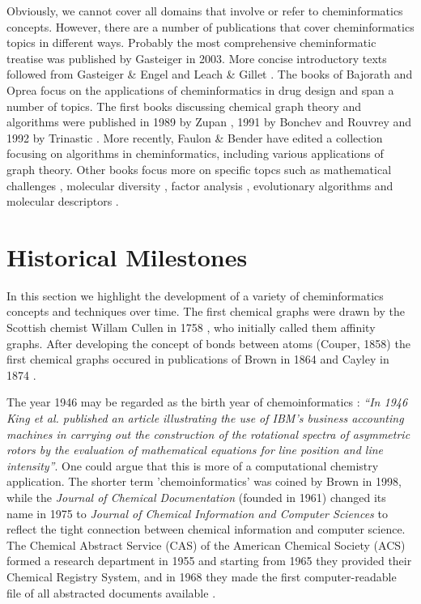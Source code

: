 \documentclass{sig-alternate}
\begin{document}
Obviously, we cannot cover all domains that involve or refer to
cheminformatics concepts. However, there are a number of publications
that cover cheminformatics topics in different ways.  Probably the
most comprehensive cheminformatic treatise was published by Gasteiger
\cite{Gasteiger2003} in 2003.  More concise introductory texts
followed from Gasteiger \& Engel \cite{gasteigerengel2003} and Leach
\& Gillet \cite{leachgillet2007}.  The books of Bajorath
\cite{Bajorath2004} and Oprea \cite{oprea2005} focus on the
applications of cheminformatics in drug design and span a number of
topics. The first books discussing chemical graph theory and
algorithms were published in 1989 by Zupan \cite{zupan1989}, 1991 by
Bonchev and Rouvrey \cite{bonchevrouvrey1991,bonchevrouvrey2003} and
1992 by Trinastic \cite{Trinajstic1992}.  More recently, Faulon \&
Bender \cite{faulon2010} have edited a collection focusing on
algorithms in cheminformatics, including various applications of graph
theory.  Other books focus more on specific topcs such as mathematical
challenges \cite{mathchallenges1995}, molecular diversity
\cite{moleculardiversity1999}, factor analysis \cite{Malinowski2002},
evolutionary algorithms \cite{clark2000} and molecular descriptors
\cite{todeschini2000}.

\section{Historical Milestones}
In this section we highlight the development of a variety of
cheminformatics concepts and techniques over time. The first chemical
graphs were drawn by the Scottish chemist Willam Cullen in 1758
\cite{bonchevrouvrey1991}, who initially called them affinity graphs.
After developing the concept of bonds between atoms (Couper, 1858) the
first chemical graphs occured in publications of Brown in 1864 and
Cayley in 1874 \cite{bonchevrouvrey1991,brown2009}.

The year 1946 may be regarded as the birth year of chemoinformatics
\cite{Chen2006}: \textit{``In 1946 King et al.\cite{kct1946} published
  an article illustrating the use of IBM's business accounting
  machines in carrying out the construction of the rotational spectra
  of asymmetric rotors by the evaluation of mathematical equations for
  line position and line intensity''}. One could argue that this is
more of a computational chemistry application. The shorter term
'chemoinformatics' was coined by Brown in 1998\cite{brown1998}, while
the \textit{Journal of Chemical Documentation} (founded in 1961)
changed its name in 1975 to \textit{Journal of Chemical Information
  and Computer Sciences} to reflect the tight connection between
chemical information and computer science. The Chemical Abstract
Service (CAS) of the American Chemical Society (ACS) formed a research
department in 1955 and starting from 1965 they provided their Chemical
Registry System, and in 1968 they made the first computer-readable
file of all abstracted documents available \cite{Chen2006}.  
\end{document}
